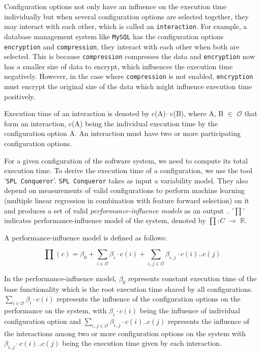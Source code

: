 Configuration options not only have an influence on the execution time individually but when several configuration options are selected together, they may interact with each other, which is called an \texttt{interaction}. For example, a database management system like \texttt{MySQL} has the configuration options \texttt{encryption} and \texttt{compression}, they interact with each other when both are selected. This is because \texttt{compression} compresses the data and \texttt{encryption} now has a smaller size of data to encrypt, which influences the execution time negatively. However, in the case where \texttt{compression} is not enabled, \texttt{encryption} must encrypt the original size of the data which might influence execution time positively. 

Execution time of an interaction is denoted by c(A)$ \cdot $ c(B), where A, B $\in$ $\mathcal{O}$ that form an interaction, c(A) being the individual execution time by the configuration option A. An interaction must have two or more participating configuration options.

For a given configuration of the software system, we need to compute its total execution time. To derive the execution time of a configuration, we use the tool '\texttt{SPL Conqueror}'. \texttt{SPL Conqueror} takes as input a variability model. They also depend on measurements of valid configurations to perform machine learning (multiple linear regression in combination with feature forward selection) on it and produces a set of valid \textit{performance-influence models} as an output~\cite{DBLP:conf/sigsoft/SiegmundGAK15}. '$\mathcal\prod$' indicates performance-influence model of the system, denoted by $\mathcal\prod$:\textit{C} $\rightarrow$ $\mathbb{R}$. 

A performance-influence model is defined as follows:

\begin{equation*}
  \prod {(c)} =  \beta_{\mathrm{0}} + \sum_{i \in \mathcal{O}} \beta_{\textit{i}} \cdot {{c(i)}} + \sum_{i..j \in \mathcal{O}} \beta_{\textit{i..j}} \cdot c(i)..c(j)
  \tag{2.2.1}\label{eq:2.2.1} 
\end{equation*}

In the performance-influence model, $\beta_{\mathrm{0}}$ represents constant execution time of the base functionality which is the root execution time shared by all configurations. $\sum_{i \in \mathcal{O}} \beta_{\textit{i}} \cdot {{ c(i)}}$ represents the influence of the configuration options on the performance on the system, with  $\beta_{\textit{i}} \cdot {{c(i)}}$ being the influence of individual configuration option and \sloppy $\sum_{i..j \in \mathcal{O}} \beta_{\textit{i..j}} \cdot c(i)..c(j)$ represents the influence of the interactions among two or more configuration options on the system with $\beta_{\textit{i..j}} \cdot c(i)..c(j)$ being the execution time given by each interaction.


